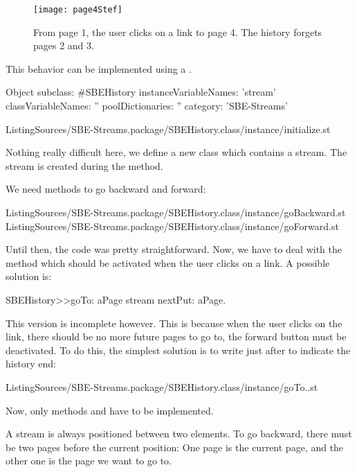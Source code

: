 \documentclass[a4paper,10pt,twoside]{book}
\begin{document}
\begin{figure}[!ht]
\centerline{\texttt{[image: page4Stef]}}
\caption{From page 1, the user clicks on a link to page 4. The history forgets pages 2 and 3.}
\label{fig:page4}
\vspace{.2in}
\end{figure}

This behavior can be implemented using a .

\begin{code}{}
Object subclass: #SBEHistory
	instanceVariableNames: 'stream'
	classVariableNames: ''
	poolDictionaries: ''
	category: 'SBE-Streams'
\end{code}

\numFiletreeMethodInput[sbehistoryinitialize]%
{}%
{ListingSources/SBE-Streams.package/SBEHistory.class/instance/initialize.st}

Nothing really difficult here, we define a new class which contains a stream.
The stream is created during the  method.

We need methods to go backward and forward:

\numFiletreeMethodInput[sbehistorygobackward]%
{}%
{ListingSources/SBE-Streams.package/SBEHistory.class/instance/goBackward.st}
\numFiletreeMethodInput[sbehistorygoforward]%
{}%
{ListingSources/SBE-Streams.package/SBEHistory.class/instance/goForward.st}

Until then, the code was pretty straightforward.
Now, we have to deal with the  method which should be activated when the user clicks on a link.
A possible solution is:

\begin{code}{}
SBEHistory>>goTo: aPage
		stream nextPut: aPage.
\end{code}

This version is incomplete however.
This is because when the user clicks on the link, there should be no more future pages to go to, \ie the forward button must be deactivated.
To do this, the simplest solution is to write  just after to indicate the history end:

\numFiletreeMethodInput[sbehistorygoto]%
{}%
{ListingSources/SBE-Streams.package/SBEHistory.class/instance/goTo..st}

Now, only methods  and  have to be implemented.

A stream is always positioned between two elements.
To go backward, there must be two pages before the current position:
One page is the current page, and the other one is the page we want to go to.
\end{document}
